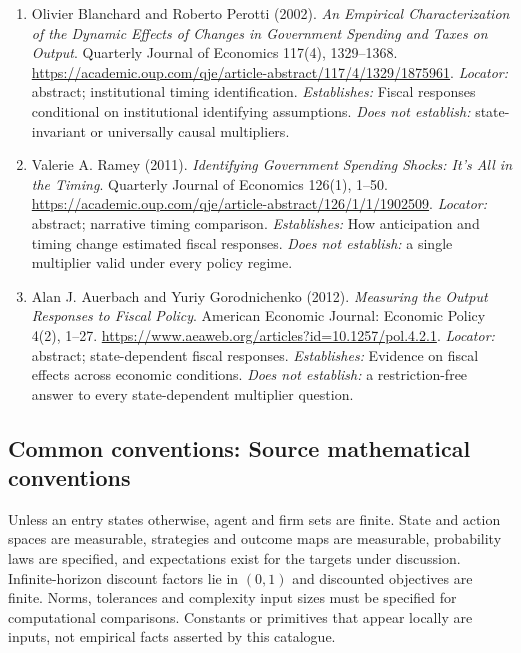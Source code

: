 \documentclass[11pt,a4paper]{article}
\begin{document}
\begin{enumerate}

\item[S1] Olivier Blanchard and Roberto Perotti (2002). \emph{An Empirical Characterization of the Dynamic Effects of Changes in Government Spending and Taxes on Output}. Quarterly Journal of Economics 117(4), 1329--1368. \url{https://academic.oup.com/qje/article-abstract/117/4/1329/1875961}. \textit{Locator:} abstract; institutional timing identification. \textit{Establishes:} Fiscal responses conditional on institutional identifying assumptions. \textit{Does not establish:} state-invariant or universally causal multipliers.

\item[S2] Valerie A. Ramey (2011). \emph{Identifying Government Spending Shocks: It's All in the Timing}. Quarterly Journal of Economics 126(1), 1--50. \url{https://academic.oup.com/qje/article-abstract/126/1/1/1902509}. \textit{Locator:} abstract; narrative timing comparison. \textit{Establishes:} How anticipation and timing change estimated fiscal responses. \textit{Does not establish:} a single multiplier valid under every policy regime.

\item[S3] Alan J. Auerbach and Yuriy Gorodnichenko (2012). \emph{Measuring the Output Responses to Fiscal Policy}. American Economic Journal: Economic Policy 4(2), 1--27. \url{https://www.aeaweb.org/articles?id=10.1257/pol.4.2.1}. \textit{Locator:} abstract; state-dependent fiscal responses. \textit{Establishes:} Evidence on fiscal effects across economic conditions. \textit{Does not establish:} a restriction-free answer to every state-dependent multiplier question.

\end{enumerate}

\subsection*{Common conventions: Source mathematical conventions}

Unless an entry states otherwise, agent and firm sets are finite. State and action spaces are measurable, strategies and outcome maps are measurable, probability laws are specified, and expectations exist for the targets under discussion. Infinite-horizon discount factors lie in $(0,1)$ and discounted objectives are finite. Norms, tolerances and complexity input sizes must be specified for computational comparisons. Constants or primitives that appear locally are inputs, not empirical facts asserted by this catalogue.
\end{document}

